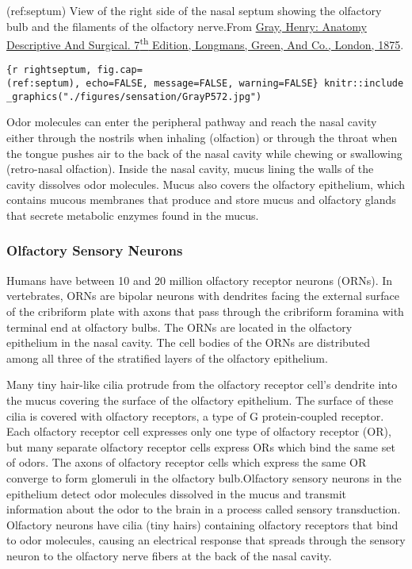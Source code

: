 (ref:septum) View of the right side of the nasal septum showing the
olfactory bulb and the filaments of the olfactory nerve.From
\href{https://wellcomelibrary.org/item/b21688692}{Gray, Henry: Anatomy
Descriptive And Surgical. 7\textsuperscript{th} Edition, Longmans,
Green, And Co., London, 1875}.

\texttt{\{r\ rightseptum,\ fig.cap=\textquotesingle{}(ref:septum)\textquotesingle{},\ echo=FALSE,\ message=FALSE,\ warning=FALSE\}\ knitr::include\_graphics("./figures/sensation/GrayP572.jpg")}

Odor molecules can enter the peripheral pathway and reach the nasal
cavity either through the nostrils when inhaling (olfaction) or through
the throat when the tongue pushes air to the back of the nasal cavity
while chewing or swallowing (retro-nasal olfaction). Inside the nasal
cavity, mucus lining the walls of the cavity dissolves odor molecules.
Mucus also covers the olfactory epithelium, which contains mucous
membranes that produce and store mucus and olfactory glands that secrete
metabolic enzymes found in the mucus.

\hypertarget{olfactory-sensory-neurons}{%
\subsubsection{Olfactory Sensory
Neurons}\label{olfactory-sensory-neurons}}

Humans have between 10 and 20 million olfactory receptor neurons (ORNs).
In vertebrates, ORNs are bipolar neurons with dendrites facing the
external surface of the cribriform plate with axons that pass through
the cribriform foramina with terminal end at olfactory bulbs. The ORNs
are located in the olfactory epithelium in the nasal cavity. The cell
bodies of the ORNs are distributed among all three of the stratified
layers of the olfactory epithelium.

Many tiny hair-like cilia protrude from the olfactory receptor cell's
dendrite into the mucus covering the surface of the olfactory
epithelium. The surface of these cilia is covered with olfactory
receptors, a type of G protein-coupled receptor. Each olfactory receptor
cell expresses only one type of olfactory receptor (OR), but many
separate olfactory receptor cells express ORs which bind the same set of
odors. The axons of olfactory receptor cells which express the same OR
converge to form glomeruli in the olfactory bulb.Olfactory sensory
neurons in the epithelium detect odor molecules dissolved in the mucus
and transmit information about the odor to the brain in a process called
sensory transduction. Olfactory neurons have cilia (tiny hairs)
containing olfactory receptors that bind to odor molecules, causing an
electrical response that spreads through the sensory neuron to the
olfactory nerve fibers at the back of the nasal cavity.

